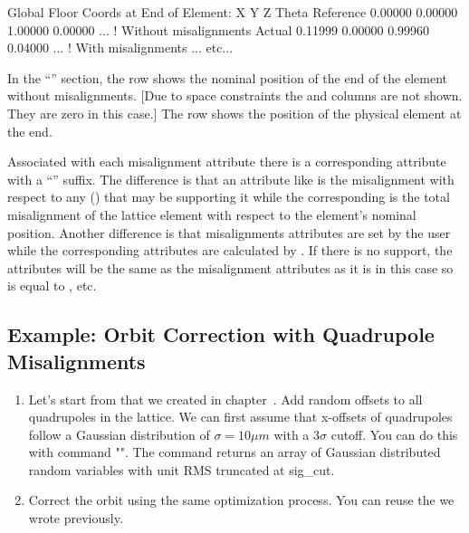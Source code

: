 \documentclass{hitec}     %
\begin{document}
{{{{\begin{code}
Global Floor Coords at End of Element:
                X        Y        Z    Theta  
Reference  0.00000  0.00000  1.00000  0.00000 ... ! Without misalignments
Actual     0.11999  0.00000  0.99960  0.04000 ... ! With misalignments
... etc...
\end{code}

In the ``'' section, the  row shows the nominal position of
the  end of the element without misalignments. [Due to space constraints the  and
 columns are not shown. They are zero in this case.] The  row shows the position
of the physical element at the  end.

Associated with each misalignment attribute there is a corresponding attribute with a ``''
suffix. The difference is that an attribute like  is the misalignment with respect to
any  () that may be supporting it while the corresponding
 is the total misalignment of the lattice element with respect to the element's
nominal position. Another difference is that misalignments attributes are set by the user while the
corresponding  attributes are calculated by \bmad. If there is no  support, the
 attributes will be the same as the misalignment attributes as it is in this case so
 is equal to , etc.

\subsection{Example: Orbit Correction with Quadrupole Misalignments}
\begin{enumerate}[leftmargin=*]
\item Let's start from  that we created in chapter~. Add random offsets to all quadrupoles in the lattice. We can first assume that x-offsets of quadrupoles follow a Gaussian distribution of $\sigma=10\unit{\mu m}$ with a $3\sigma$ cutoff. You can do this with \tao command "". The  command returns an array of Gaussian distributed random variables with unit RMS truncated at sig\_cut.

\item Correct the orbit using the same optimization process. You can reuse the  we wrote previously.


\end{enumerate}}}}}
\end{document}
